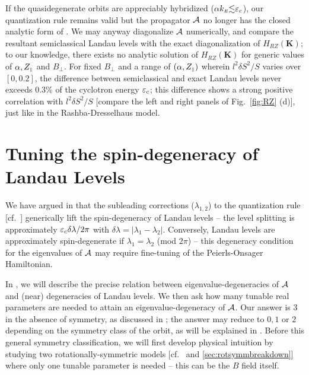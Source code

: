 \documentclass[aps, prb, showpacs, twocolumn, notitlepage, superscriptaddress]{revtex4-1}
\begin{document}
If the quasidegenerate orbits are appreciably hybridized ($\alpha k_{\scriptscriptstyle{E}}{\lesssim}\varepsilon_c$), our quantization rule  remains valid but the propagator ${\cal A}$ no longer has the closed analytic form of . We may anyway diagonalize ${\cal A}$ numerically, and compare the resultant semiclassical Landau levels with the exact diagonalization of $H_{RZ}(\boldsymbol{K})$; to our knowledge, there exists no analytic solution of $H_{RZ}(\boldsymbol{K})$ for generic values of $\alpha,Z_{\scriptscriptstyle{\parallel}}$ and $B_{\perp}$. For fixed  $B_{\perp}$ and a range of $(\alpha,Z_{\scriptscriptstyle{\parallel}})$ wherein  $l^2\delta S^2/S$ varies over $[0,0.2]$, the difference between semiclassical and exact Landau levels never exceeds  0.3\% of the cyclotron energy $\varepsilon_c$; this difference shows a strong positive correlation with $l^2\delta S^2/S$ [compare the left and right panels of Fig.\ \ref{fig:RZ} (d)], just like in the Rashba-Dresselhaus model. 

\section{Tuning the spin-degeneracy of Landau Levels}\label{sec:llquasideg}

We have argued in  that the subleading corrections ($\lambda_{1,2}$) to the quantization rule [cf.\ ] generically lift the spin-degeneracy of Landau levels -- the level splitting is approximately $\varepsilon_c\delta \lambda/2\pi$ with $\delta \lambda=|\lambda_1-\lambda_2|$. Conversely, Landau levels are approximately spin-degenerate if $\lambda_1{=}\lambda_2$ (mod $2\pi$) -- this degeneracy condition for the eigenvalues of ${\cal A}$ may require fine-tuning of the Peierls-Onsager Hamiltonian.  

In , we will describe the precise relation between eigenvalue-degeneracies of  ${\cal A}$ and (near) degeneracies of Landau levels. We then ask how many tunable real parameters are needed to attain an eigenvalue-degeneracy of ${\cal A}$. Our answer is  $3$ in the absence of symmetry, as discussed in ; the answer may reduce to $0,1$ or $2$ depending on the symmetry class of the orbit, as will be explained in . Before this general symmetry classification,  we will first develop physical intuition by studying two rotationally-symmetric models [cf.\  and \ref{sec:rotsymmbreakdown}] where only one tunable parameter is needed -- this can be the $B$ field itself.
\end{document}
